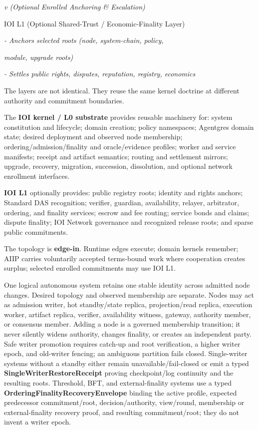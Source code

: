 \documentclass[
  11pt,
]{article}
\begin{document}
\emph{v (Optional Enrolled Anchoring \& Escalation)}

IOI L1 (Optional Shared-Trust / Economic-Finality Layer)

\emph{- Anchors selected roots (node, system-chain, policy,}

\emph{module, upgrade roots)}

\emph{- Settles public rights, disputes, reputation, registry,
economics}

The layers are not identical. They reuse the same kernel doctrine at
different authority and commitment boundaries.

The \textbf{IOI kernel / L0 substrate} provides reusable machinery for:
system constitution and lifecycle; domain creation; policy namespaces;
Agentgres domain state; desired deployment and observed node membership;
ordering/admission/finality and oracle/evidence profiles; worker and service
manifests; receipt and artifact semantics; routing and settlement mirrors;
upgrade, recovery, migration, succession, dissolution, and optional network
enrollment interfaces.

\textbf{IOI L1} optionally provides: public registry roots; identity and rights
anchors; Standard DAS recognition; verifier, guardian, availability, relayer,
arbitrator, ordering, and finality services; escrow and fee routing; service
bonds and claims; dispute finality; IOI Network governance and recognized
release roots; and sparse public commitments.

The topology is \textbf{edge-in}. Runtime edges execute; domain kernels
remember; AIIP carries voluntarily accepted terms-bound work where cooperation
creates surplus; selected enrolled commitments may use IOI L1.

One logical autonomous system retains one stable identity across admitted node
changes. Desired topology and observed membership are separate. Nodes may act as
admission writer, hot standby/state replica, projection/read replica, execution
worker, artifact replica, verifier, availability witness, gateway, authority
member, or consensus member. Adding a node is a governed membership transition;
it never silently widens authority, changes finality, or creates an independent
party. Safe writer promotion requires catch-up and root verification, a higher
writer epoch, and old-writer fencing; an ambiguous partition fails closed.
Single-writer systems without a standby either remain unavailable/fail-closed
or emit a typed \textbf{SingleWriterRestoreReceipt} proving checkpoint/log
continuity and the resulting roots. Threshold, BFT, and external-finality
systems use a typed \textbf{OrderingFinalityRecoveryEnvelope} binding the active
profile, expected predecessor commitment/root, decision/authority, view/round,
membership or external-finality recovery proof, and resulting commitment/root;
they do not invent a writer epoch.
\end{document}
